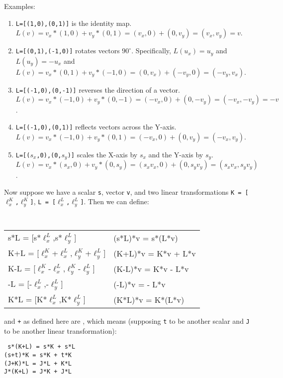 \documentclass[12pt]{article}
\begin{document}
Examples:
\begin{enumerate}
\item {\tt L=[(1,0),(0,1)]} is the identity map.
$L(v)=v_x*(1,0) + v_y*(0,1) = (v_x,0)+(0,v_y) = (v_x,v_y) = v$.
\item {\tt L=[(0,1),(-1,0)]} rotates vectors $90^\circ$.
Specifically, $L(u_x)=u_y$ and $L(u_y)=-u_x$ and
$L(v)=v_x*(0,1) + v_y*(-1,0) = (0,v_x)+(-v_y,0) = (-v_y,v_x)$.
\item {\tt L=[(-1,0),(0,-1)]} reverses the direction of a vector.
$L(v)=v_x*(-1,0) + v_y*(0,-1) = (-v_x,0)+(0,-v_y) = (-v_x,-v_y) = -v$.
\item {\tt L=[(-1,0),(0,1)]} reflects vectors across the Y-axis.
$L(v)=v_x*(-1,0) + v_y*(0,1) = (-v_x,0)+(0,v_y) = (-v_x,v_y)$.
\item {\tt L=[($s_x$,0),(0,$s_y$)]} scales the X-axis by $s_x$ and
the Y-axis by $s_y$. \\
$L(v)=v_x*(s_x,0) + v_y*(0,s_y)
     = (s_x v_x,0)+(0,s_y v_y)= (s_x v_x, s_y v_y)$.
\end{enumerate}

Now suppose we have a scalar {\tt s}, vector {\tt v},
and two linear transformations
{\tt K = [$\ell^K_x$,$\ell^K_y$]},
{\tt L = [$\ell^L_x$,$\ell^L_y$]}.  Then we can define:
\begin{center}
\tt
\begin{tabular}{l@{~so that~}l}
s*L = [s*$\ell^L_x$,s*$\ell^L_y$]
	 & (s*L)*v = s*(L*v) \\[0.3ex]
K+L = [$\ell^K_x$+$\ell^L_x$,$\ell^K_y$+$\ell^L_y$]
	 & (K+L)*v = K*v + L*v \\[0.3ex]
K-L = [$\ell^K_x$-$\ell^L_x$,$\ell^K_y$-$\ell^L_y$]
	 & (K-L)*v = K*v - L*v \\[0.3ex]
-L = [-$\ell^L_x$,-$\ell^L_y$]
	 & (-L)*v = - L*v \\[0.3ex]
K*L = [K*$\ell^L_x$,K*$\ell^L_y$]
	 & (K*L)*v = K*(L*v)
\end{tabular}
\end{center}

{\tt *} and {\tt +} as defined here are , which means
(supposing {\tt t} to be another scalar and
{\tt J} to be another linear transformation):
\begin{center}
\tt
s*(K+L) = s*K + s*L \\
(s+t)*K = s*K + t*K \\
(J+K)*L = J*L + K*L \\
J*(K+L) = J*K + J*L
\end{center}
\end{document}
